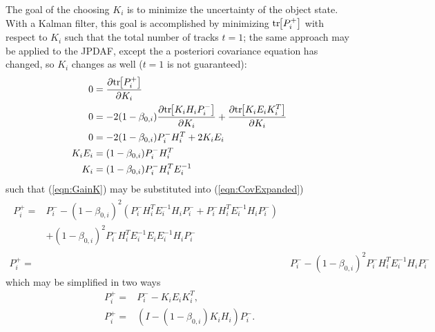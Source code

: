 \documentclass[10pt]{article}
\newcommand{\bracket}[1]{\ensuremath{\left[ #1 \right]}}
\newcommand{\refeqn}[1]{(\ref{eqn:#1})}
\newcommand{\tr}[1]{\mathrm{tr}\ensuremath{\negthickspace\bracket{#1}}}
\theoremstyle{plain}\theorembodyfont{\normalfont}
\begin{document}
The goal of the choosing $K_i$ is to minimize the uncertainty of the object state. With a Kalman filter, this goal is accomplished by minimizing $\tr{P^+_i}$ with respect to $K_i$ such that the total number of tracks $t=1$; the same approach may be applied to the JPDAF, except the a posteriori covariance equation has changed, so $K_i$ changes as well ($t=1$ is not guaranteed):
\begin{align}
0&=\frac{\partial\tr{P^+_i}}{\partial K_i}
\\
0&=-2(1-\beta_{0,i})\frac{\partial\tr{K_iH_iP^-_i}}{\partial K_i}+\frac{\partial\tr{K_iE_iK_i^T}}{\partial K_i}
\\
0&=-2(1-\beta_{0,i})P^-_iH_i^T+2K_iE_i\label{eqn:Uncertainty0}
\\
K_iE_i&=(1-\beta_{0,i})P^-_iH_i^T
\\
K_i&=(1-\beta_{0,i})P^-_iH_i^TE_i^{-1}\label{eqn:GainK}
\end{align}
such that \refeqn{GainK} may be substituted into \refeqn{CovExpanded}
\begin{align}
\begin{split}
P^+_{i}=&P^-_{i}-(1-\beta_{0,i})^2(P^-_iH_i^TE_i^{-1}H_iP^-_i+P^-_iH_i^TE_i^{-1}H_iP^-_i)
\\
&+(1-\beta_{0,i})^2P^-_iH_i^TE_i^{-1}E_iE_i^{-1}H_iP^-_i
\end{split}
\\
P^+_{i}=&P^-_{i}-(1-\beta_{0,i})^2P^-_iH_i^TE_i^{-1}H_iP^-_i
\end{align}
which may be simplified in two ways
\begin{align}
P^+_{i}=&P^-_{i}-K_iE_iK_i^T,\label{eqn:JPDAFPostCovSymmetricUpdate}
\\
P^+_{i}=&\left(I-(1-\beta_{0,i})K_iH_i\right)P^-_i.\label{eqn:JPDAFPostCovSimpleUpdate}
\end{align}
\end{document}
